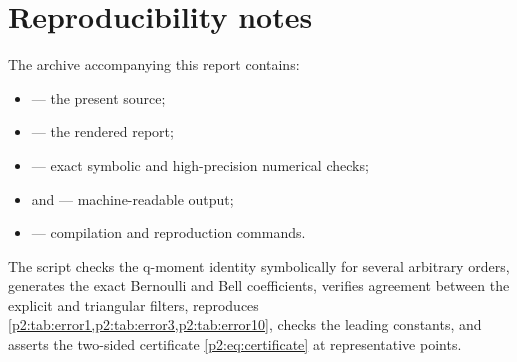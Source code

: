 \documentclass[11pt,oneside]{article}
\numberwithin{equation}{section}
\theoremstyle{definition}
\theoremstyle{remark}
\begin{document}
\section{Reproducibility notes}
\label{p2:app:repro}

The archive accompanying this report contains:
\begin{itemize}[leftmargin=8mm]
\item {} --- the present source;
\item {} --- the rendered report;
\item {} --- exact symbolic and high-precision
numerical checks;
\item {} and  ---
machine-readable output;
\item {} --- compilation and reproduction commands.
\end{itemize}

The script checks the q-moment identity symbolically for several arbitrary
orders, generates the exact Bernoulli and Bell coefficients, verifies agreement
between the explicit and triangular filters, reproduces
\cref{p2:tab:error1,p2:tab:error3,p2:tab:error10}, checks the leading constants, and
asserts the two-sided certificate \eqref{p2:eq:certificate} at representative
points.
\end{document}
